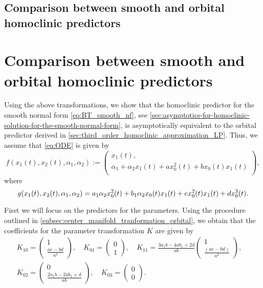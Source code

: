 \ifthesis
\subsection{Comparison between smooth and orbital homoclinic predictors}
\else
\section{Comparison between smooth and orbital homoclinic predictors}
\fi
\label{sec:comparison_homoclinic_predictors}
Using the above transformations, we show that the homoclinic predictor for the
smooth normal form \cref{eq:BT_smooth_nf}, see
\cref{sec:asymptotics-for-homoclinic-solution-for-the-smooth-normal-form}, is
asymptotically equivalent to the orbital predictor derived in
\cref{sec:third_order_homoclinic_approximation_LP}. Thus, we assume that
\cref{eq:ODE} is given by 
\begin{equation}
    \label{eq:compare:f_normal_form} 
    f(x_1(t), x_2(t), \alpha_1, \alpha_2) := \left(\begin{array}{c}
            x_1(t),\\
            \alpha_1 + \alpha_2 x_1(t) + ax_0^2(t) + b x_0(t)x_1(t) \\
    \end{array}\right),
\end{equation}
where
\begin{equation*}
    g(x_1(t), x_2(t), \alpha_1, \alpha_2) =  a_1\alpha_2 x_0^2(t) + 
    b_1\alpha_2 x_0(t) x_1(t) + ex_0^{2}(t)x_1(t) + dx_0^3(t). \\
\end{equation*}

First we will focus on the predictors for the parameters. Using the procedure
outlined in \cref{subsec:center_manifold_tranformation_orbital}, we obtain that the
coefficients for the parameter transformation $K$ are given by
\begin{equation*}
\begin{gathered}
				K_{10} = \begin{pmatrix} 1 \\ \frac{ae -bd}{a^2} \end{pmatrix},\quad
				K_{01} = \begin{pmatrix} 0 \\ 1 \end{pmatrix},\quad
				K_{11} = \frac{3a_1b-4ab_1+2d}{ab}\begin{pmatrix}  1
								\\ \frac{(ae-bd)}{a^2} \end{pmatrix},\quad \\
				K_{02} = \begin{pmatrix} 0 \\ \frac{2a_1b-2ab_1+d}{ab} \end{pmatrix},\quad
				K_{03} = \begin{pmatrix} 0 \\ 0 \end{pmatrix}.
\end{gathered} 
\end{equation*}

